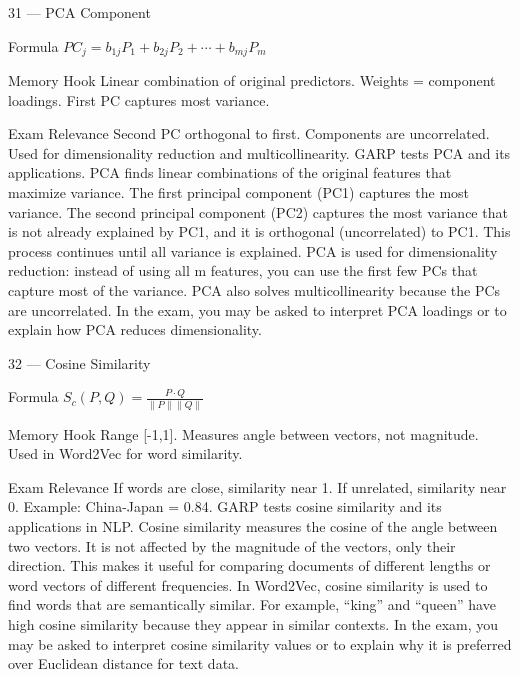 \documentclass[aspectratio=169,8pt]{beamer}
\begin{document}
	\begin{frame}{31 --- PCA Component}
		\begin{block}{Formula}
			$PC_j = b_{1j}P_1 + b_{2j}P_2 + \cdots + b_{mj}P_m$
		\end{block}
		\begin{block}{Memory Hook}
			Linear combination of original predictors. Weights = component loadings. First PC captures most variance.
		\end{block}
		\begin{block}{Exam Relevance}
			Second PC orthogonal to first. Components are uncorrelated. Used for dimensionality reduction and multicollinearity. GARP tests PCA and its applications. PCA finds linear combinations of the original features that maximize variance. The first principal component (PC1) captures the most variance. The second principal component (PC2) captures the most variance that is not already explained by PC1, and it is orthogonal (uncorrelated) to PC1. This process continues until all variance is explained. PCA is used for dimensionality reduction: instead of using all m features, you can use the first few PCs that capture most of the variance. PCA also solves multicollinearity because the PCs are uncorrelated. In the exam, you may be asked to interpret PCA loadings or to explain how PCA reduces dimensionality.
		\end{block}
	\end{frame}
	
	\begin{frame}{32 --- Cosine Similarity}
		\begin{block}{Formula}
			$S_c(P,Q) = \frac{P \cdot Q}{\|P\| \|Q\|}$
		\end{block}
		\begin{block}{Memory Hook}
			Range [-1,1]. Measures angle between vectors, not magnitude. Used in Word2Vec for word similarity.
		\end{block}
		\begin{block}{Exam Relevance}
			If words are close, similarity near 1. If unrelated, similarity near 0. Example: China-Japan = 0.84. GARP tests cosine similarity and its applications in NLP. Cosine similarity measures the cosine of the angle between two vectors. It is not affected by the magnitude of the vectors, only their direction. This makes it useful for comparing documents of different lengths or word vectors of different frequencies. In Word2Vec, cosine similarity is used to find words that are semantically similar. For example, ``king'' and ``queen'' have high cosine similarity because they appear in similar contexts. In the exam, you may be asked to interpret cosine similarity values or to explain why it is preferred over Euclidean distance for text data.
		\end{block}
	\end{frame}
	
\end{document}
